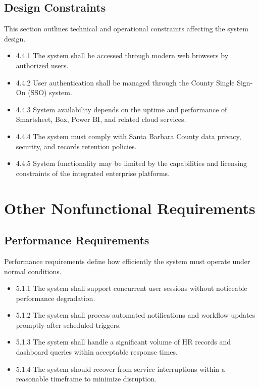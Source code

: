 \documentclass[12pt]{article}
\begin{document}
\subsection{Design Constraints}

This section outlines technical and operational constraints affecting the system design.

\begin{itemize}
    \item 4.4.1 The system shall be accessed through modern web browsers by authorized users.

    \item 4.4.2 User authentication shall be managed through the County Single Sign-On (SSO) system.

    \item 4.4.3 System availability depends on the uptime and performance of Smartsheet, Box, Power BI, and related cloud services.

    \item 4.4.4 The system must comply with Santa Barbara County data privacy, security, and records retention policies.

    \item 4.4.5 System functionality may be limited by the capabilities and licensing constraints of the integrated enterprise platforms.
\end{itemize}

\section{Other Nonfunctional Requirements}

\subsection{Performance Requirements}

Performance requirements define how efficiently the system must operate under normal conditions.

\begin{itemize}
    \item 5.1.1 The system shall support concurrent user sessions without noticeable performance degradation.
    \item 5.1.2 The system shall process automated notifications and workflow updates promptly after scheduled triggers.
    \item 5.1.3 The system shall handle a significant volume of HR records and dashboard queries within acceptable response times.
    \item 5.1.4 The system should recover from service interruptions within a reasonable timeframe to minimize disruption.
\end{itemize}
\end{document}

